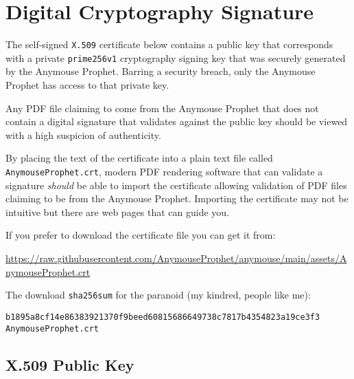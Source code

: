 \cleardoublepage %
\section*{Digital Cryptography Signature}
\hypertarget{cryptsig}{}


The self-signed \texttt{X.509} certificate below contains a public key that corresponds with a private \texttt{prime256v1} cryptography signing key that was securely generated by the Anymouse Prophet. Barring a security breach, only the Anymouse Prophet has access to that private key.

Any PDF file claiming to come from the Anymouse Prophet that does not contain a digital signature that validates against the public key should be viewed with a high suspicion of authenticity.

By placing the text of the certificate into a plain text file called \texttt{AnymouseProphet.crt}, modern PDF rendering software that can validate a signature \emph{should} be able to import the certificate allowing validation of PDF files claiming to be from the Anymouse Prophet. Importing the certificate may not be intuitive but there are web pages that can guide you.

If you prefer to download the certificate file you can get it from:

\bigskip

\url{https://raw.githubusercontent.com/AnymouseProphet/anymouse/main/assets/AnymouseProphet.crt}

\bigskip

The download \texttt{sha256sum} for the paranoid (my kindred, people like me):

\makeatletter
\newcommand{\verbatimfont}[1]{\renewcommand{\verbatim@font}{\ttfamily#1}}
\makeatother

\verbatimfont{\footnotesize}%
\begin{verbatim}
b1895a8cf14e86383921370f9beed60815686649738c7817b4354823a19ce3f3  AnymouseProphet.crt
\end{verbatim}

\subsection*{X.509 Public Key}

